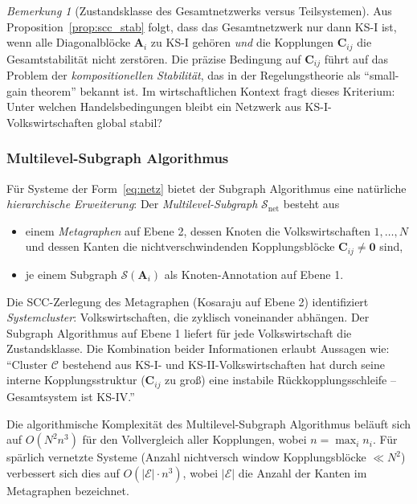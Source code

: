 ﻿\documentclass[12pt, a4paper, titlepage]{report}
\theoremstyle{definition}
\theoremstyle{remark}
\newtheorem{remark}[theorem]{Bemerkung}
\newcommand{\vA}{\bm{A}}
\newcommand{\vC}{\bm{C}}
\begin{document}
\begin{remark}[Zustandsklasse des Gesamtnetzwerks versus Teilsystemen]
Aus Proposition~\ref{prop:scc_stab} folgt, dass das Gesamtnetzwerk nur dann KS-I ist,
wenn alle Diagonalblöcke $\vA_i$ zu KS-I gehören \emph{und} die Kopplungen $\vC_{ij}$
die Gesamtstabilität nicht zerstören. Die präzise Bedingung auf $\vC_{ij}$ führt auf
das Problem der \emph{kompositionellen Stabilität}, das in der Regelungstheorie als
``small-gain theorem'' bekannt ist. Im wirtschaftlichen Kontext fragt dieses Kriterium:
Unter welchen Handelsbedingungen bleibt ein Netzwerk aus KS-I-Volkswirtschaften global stabil?
\end{remark}

\subsubsection*{Multilevel-Subgraph Algorithmus}

Für Systeme der Form~\eqref{eq:netz} bietet der Subgraph Algorithmus eine natürliche
\emph{hierarchische Erweiterung}: Der \emph{Multilevel-Subgraph} $\mathcal{S}_{\mathrm{net}}$
besteht aus
\begin{itemize}
  \item einem \emph{Metagraphen} auf Ebene 2, dessen Knoten die Volkswirtschaften
    $1, \ldots, N$ und dessen Kanten die nichtver\-schwindenden Kopplungsblöcke
    $\vC_{ij} \neq \bm{0}$ sind,
  \item je einem Subgraph $\mathcal{S}(\vA_i)$ als Knoten-Annotation auf Ebene 1.
\end{itemize}
Die SCC-Zerlegung des Metagraphen (Kosaraju auf Ebene 2) identifiziert
\emph{Systemcluster}: Volkswirtschaften, die zyklisch voneinander abhängen. Der
Subgraph Algorithmus auf Ebene 1 liefert für jede Volkswirtschaft die Zustandsklasse.
Die Kombination beider Informationen erlaubt Aussagen wie: ``Cluster $\mathcal{C}$
bestehend aus KS-I- und KS-II-Volkswirtschaften hat durch seine interne Kopplungsstruktur
($\vC_{ij}$ zu groß) eine instabile Rückkopplungsschleife -- Gesamtsystem ist KS-IV.''

Die algorithmische Komplexität des Multilevel-Subgraph Algorithmus beläuft sich auf
$O(N^2 n^3)$ für den Vollvergleich aller Kopplungen, wobei $n = \max_i n_i$.
Für spärlich vernetzte Systeme (Anzahl nichtversch window Kopplungsblöcke $\ll N^2$)
verbessert sich dies auf $O(|\mathcal{E}| \cdot n^3)$, wobei $|\mathcal{E}|$ die
Anzahl der Kanten im Metagraphen bezeichnet.

\end{document}
